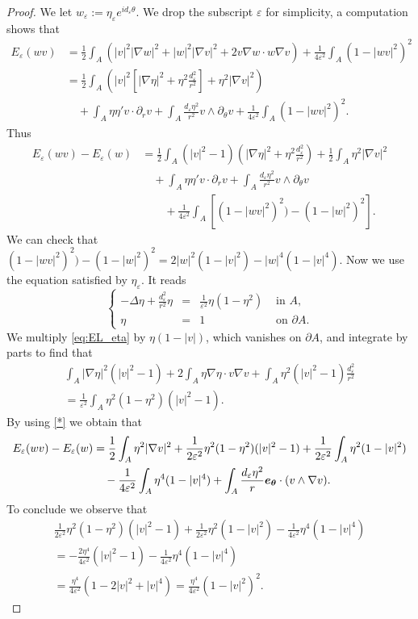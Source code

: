 \documentclass[10pt,a4paper]{amsart}
\def \p {\partial}
\def\e {{\varepsilon}}
\renewcommand{\vec}[1]{\text{\boldmath $#1$}}
\begin{document}
\begin{proof}
We let \(w_\e:=\eta_\e e^{id_\e \theta}\). We drop the subscript \(\e\) for simplicity, a computation shows that
\begin{align*}
E_\e(w v)&=\frac12 \int_A \left(|v|^2 |\nabla w|^2 + |w|^2 |\nabla v|^2 +2v\nabla w\cdot w \nabla v\right) +\frac{1}{4\e^2}\int_A (1-|w v|^2)^2 \\
&= \frac12 \int_A \left( |v|^2 \left[|\nabla \eta|^2+\eta^2 \frac{d_\e^2}{r^2}\right]+\eta^2|\nabla v|^2\right)\\
& \quad + \int_A \eta \eta' v\cdot \p_rv + \int_A \frac{d_\e \eta^2}{r^2} v\wedge \p_\theta v +\frac{1}{4\e^2}\int_A (1-|wv|^2)^2.
\end{align*}
Thus
\begin{align*}
E_\e(wv)-E_\e(w) &=\frac12 \int_A (|v|^2-1) (|\nabla \eta|^2+\eta^2 \frac{d_\e^2}{r^2})+\frac12 \int_A \eta^2|\nabla v|^2 \\
& \quad +\int_A \eta \eta' v\cdot \p_rv+\int_A \frac{d_\e \eta^2}{r^2} v\wedge \p_\theta v \\
& \quad \quad +\frac{1}{4\e^2}\int_A [(1-|wv|^2)^2)-(1-|w|^2)^2].
\end{align*}
We can check that \((1-|wv|^2)^2)-(1-|w|^2)^2=2|w|^2(1-|v|^2)-|w|^4(1-|v|^4)\).
Now we use the equation satisfied by \(\eta_\e\). It reads
\begin{equation}\label{eq:EL_eta}
\left\{
\begin{array}{rcll}
-\Delta \eta +\frac{d_\e^2  }{r^2}\eta &=& \frac{1}{\e^2}\eta(1-\eta^2) &\text{ in } A, \\
\eta&=&1 & \text{ on } \p A.
\end{array}
\right.
\end{equation}
We multiply \eqref{eq:EL_eta} by \(\eta (1-|v|)\), which  vanishes on \(\p A\), and integrate by parts to find that
\begin{multline}\label{*}
\int_A |\nabla \eta|^2(|v|^2-1)+2\int_A \eta \nabla \eta \cdot v \nabla v+\int_A \eta^2 (|v|^2-1)\frac{d_\e^2}{r^2} \\
= \frac{1}{\e^2}\int_A \eta^2(1-\eta^2)(|v|^2-1).
\end{multline}
By using \eqref{*} we obtain that 
\begin{align*}
E_\e(wv)-E_\e(w)&= \frac12 \int_A \eta^2|\nabla v|^2+\frac{1}{2\e^2}\eta^2(1-\eta^2)(|v|^2-1)+\frac{1}{2\e^2}\int_A \eta^2(1-|v|^2) \\
& \quad -\frac{1}{4\e^2}\int_A \eta^4 (1-|v|^4)+\int_A \frac{d_\e \eta^2}{r}\vec{e_\theta}\cdot (v\wedge \nabla v).
\end{align*}
To conclude we observe that 
\begin{align*}
\frac{1}{2\e^2}\eta^2(1-\eta^2)(|v|^2-1)+\frac{1}{2\e^2}\eta^2(1-|v|^2)-\frac{1}{4\e^2} \eta^4 (1-|v|^4) \\
= -\frac{2\eta^4}{4\e^2}(|v|^2-1)-\frac{1}{4\e^2}\eta^4 (1-|v|^4) \\
=\frac{\eta^4}{4\e^2}(1-2|v|^2+|v|^4)=\frac{\eta^4}{4\e^2}(1-|v|^2)^2.
\end{align*}
\end{proof}
\end{document}
